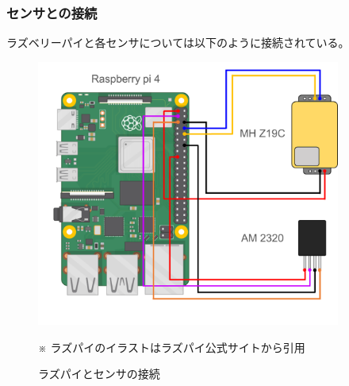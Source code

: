 \documentclass[a4paper]{jsarticle}
\begin{document}
\subsubsection{センサとの接続}
ラズベリーパイと各センサについては以下のように接続されている。
\begin{figure}[htbp]
    \begin{center}
        \includegraphics[width=100mm]{images/raspberry-pi_2.png}
        \caption{ラズパイとセンサの接続}
    \end{center}
    \begin{center}
        ※ ラズパイのイラストはラズパイ公式サイトから引用
    \end{center}
\end{figure}
\end{document}

